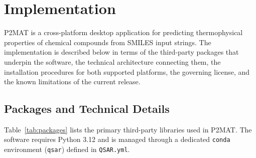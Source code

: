 
\section{Implementation}
\label{sec:implementation}

P2MAT is a cross-platform desktop application for predicting thermophysical
properties of chemical compounds from SMILES input strings.
The implementation is described below in terms of the third-party packages that
underpin the software, the technical architecture connecting them, the
installation procedures for both supported platforms, the governing license, and
the known limitations of the current release.

\subsection{Packages and Technical Details}
\label{subsec:packages}

Table~\ref{tab:packages} lists the primary third-party libraries used in P2MAT.
The software requires Python 3.12 and is managed through a dedicated
\texttt{conda} environment (\texttt{qsar}) defined in \texttt{QSAR.yml}.

